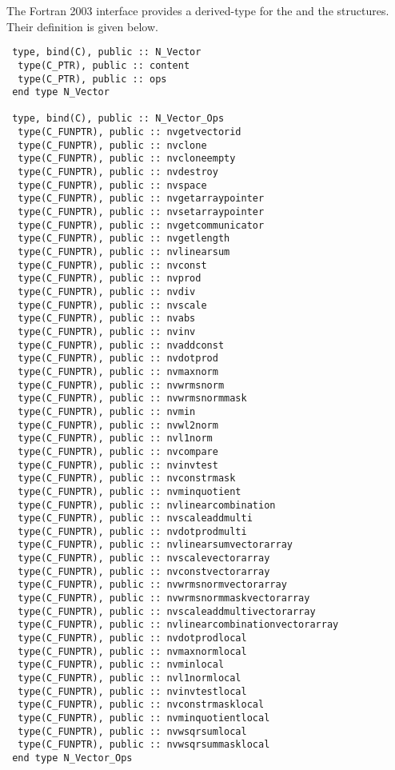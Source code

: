 The Fortran 2003 interface provides a  derived-type for the
 and the  structures.
Their definition is given below.
\begin{verbatim}
 type, bind(C), public :: N_Vector
  type(C_PTR), public :: content
  type(C_PTR), public :: ops
 end type N_Vector

 type, bind(C), public :: N_Vector_Ops
  type(C_FUNPTR), public :: nvgetvectorid
  type(C_FUNPTR), public :: nvclone
  type(C_FUNPTR), public :: nvcloneempty
  type(C_FUNPTR), public :: nvdestroy
  type(C_FUNPTR), public :: nvspace
  type(C_FUNPTR), public :: nvgetarraypointer
  type(C_FUNPTR), public :: nvsetarraypointer
  type(C_FUNPTR), public :: nvgetcommunicator
  type(C_FUNPTR), public :: nvgetlength
  type(C_FUNPTR), public :: nvlinearsum
  type(C_FUNPTR), public :: nvconst
  type(C_FUNPTR), public :: nvprod
  type(C_FUNPTR), public :: nvdiv
  type(C_FUNPTR), public :: nvscale
  type(C_FUNPTR), public :: nvabs
  type(C_FUNPTR), public :: nvinv
  type(C_FUNPTR), public :: nvaddconst
  type(C_FUNPTR), public :: nvdotprod
  type(C_FUNPTR), public :: nvmaxnorm
  type(C_FUNPTR), public :: nvwrmsnorm
  type(C_FUNPTR), public :: nvwrmsnormmask
  type(C_FUNPTR), public :: nvmin
  type(C_FUNPTR), public :: nvwl2norm
  type(C_FUNPTR), public :: nvl1norm
  type(C_FUNPTR), public :: nvcompare
  type(C_FUNPTR), public :: nvinvtest
  type(C_FUNPTR), public :: nvconstrmask
  type(C_FUNPTR), public :: nvminquotient
  type(C_FUNPTR), public :: nvlinearcombination
  type(C_FUNPTR), public :: nvscaleaddmulti
  type(C_FUNPTR), public :: nvdotprodmulti
  type(C_FUNPTR), public :: nvlinearsumvectorarray
  type(C_FUNPTR), public :: nvscalevectorarray
  type(C_FUNPTR), public :: nvconstvectorarray
  type(C_FUNPTR), public :: nvwrmsnormvectorarray
  type(C_FUNPTR), public :: nvwrmsnormmaskvectorarray
  type(C_FUNPTR), public :: nvscaleaddmultivectorarray
  type(C_FUNPTR), public :: nvlinearcombinationvectorarray
  type(C_FUNPTR), public :: nvdotprodlocal
  type(C_FUNPTR), public :: nvmaxnormlocal
  type(C_FUNPTR), public :: nvminlocal
  type(C_FUNPTR), public :: nvl1normlocal
  type(C_FUNPTR), public :: nvinvtestlocal
  type(C_FUNPTR), public :: nvconstrmasklocal
  type(C_FUNPTR), public :: nvminquotientlocal
  type(C_FUNPTR), public :: nvwsqrsumlocal
  type(C_FUNPTR), public :: nvwsqrsummasklocal
 end type N_Vector_Ops
\end{verbatim}

